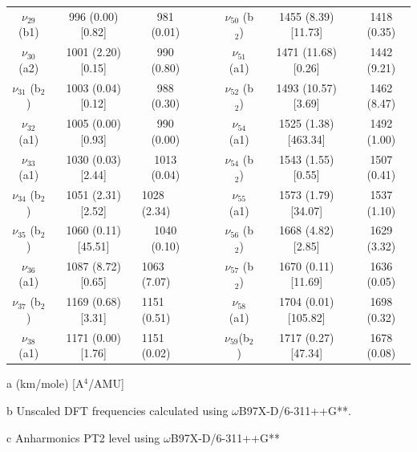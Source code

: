 \begin{table}[H]
\begin{center}
\begin{threeparttable}
{\begin{tabular}{c c c c c c c c}
$\nu_{29}$ (b1)& 996 (0.00) [0.82] & 981 (0.01) &  &  & $\nu_{50}$ (b$_{2}$) & 1455 (8.39) [11.73] & 1418 (0.35) \\ 
$\nu_{30}$ (a2) & 1001 (2.20) [0.15] & 990 (0.80) &  &  & $\nu_{51}$ (a1) & 1471 (11.68) [0.26] & 1442 (9.21)  \\ 
$\nu_{31}$ (b$_{2}$) & 1003 (0.04) [0.12] & 988 (0.30) &  &  & $\nu_{52}$ (b$_{2}$) & 1493 (10.57) [3.69] & 1462 (8.47) \\ 
$\nu_{32}$ (a1)& 1005 (0.00) [0.93] & 990 (0.00) &  &  & $\nu_{54}$ (a1) & 1525 (1.38) [463.34] & 1492 (1.00) \\ 
$\nu_{33}$ (a1) & 1030 (0.03) [2.44] & 1013 (0.04) &  &  &   $\nu_{54}$ (b$_{2}$) & 1543 (1.55) [0.55] & 1507 (0.41) \\ 
$\nu_{34}$ (b$_{2}$) & 1051 (2.31) [2.52] & \multicolumn{1}{l}{1028 (2.34)} &  &  &   $\nu_{55}$ (a1) & 1573 (1.79) [34.07] & 1537 (1.10) \\ 
$\nu_{35}$ (b$_{2}$)  & 1060 (0.11) [45.51] & 1040 (0.10) &  &  & $\nu_{56}$ (b$_{2}$) & 1668 (4.82) [2.85] & 1629 (3.32) \\ 
$\nu_{36}$ (a1) & 1087 (8.72) [0.65] & \multicolumn{1}{l}{1063 (7.07)} &  &  & $\nu_{57}$ (b$_{2}$) & 1670 (0.11) [11.69] & 1636 (0.05) \\ 
$\nu_{37}$ (b$_{2}$) & 1169 (0.68) [3.31] & \multicolumn{1}{l}{1151 (0.51)} &  &  & $\nu_{58}$ (a1)& 1704 (0.01) [105.82] & 1698 (0.32) \\ 
$\nu_{38}$ (a1) & 1171 (0.00) [1.76] & \multicolumn{1}{l}{1151 (0.02)} &  &  & $\nu_{59}$(b$_{2}$) & 1717 (0.27) [47.34] & 1678 (0.08) \\ 		
	\bottomrule
\end{tabular}}

\begin{tablenotes}
	\item[a] (km/mole) [A$^{4}$/AMU]
	\item[b] Unscaled DFT frequencies calculated using $\omega$B97X-D/6-311++G**.
	\item[c] Anharmonics PT2 level using $\omega$B97X-D/6-311++G** 
\end{tablenotes}
\end{threeparttable}
\end{center}
\label{freq-Cyclopentaphenanthrene}
\end{table}

			


